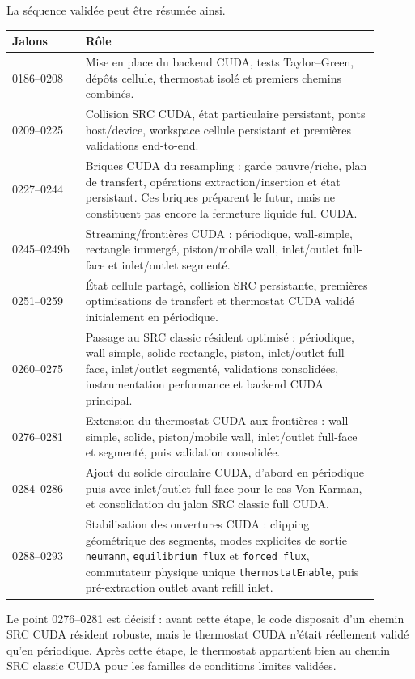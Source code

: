 \documentclass[11pt,a4paper]{article}
\begin{document}
La séquence validée peut être résumée ainsi.
\begin{center}
\begin{tabular}{p{0.18\linewidth}p{0.72\linewidth}}
\toprule
Jalons & Rôle \\
\midrule
0186--0208 & Mise en place du backend CUDA, tests Taylor--Green, dépôts cellule, thermostat isolé et premiers chemins combinés. \\
0209--0225 & Collision SRC CUDA, état particulaire persistant, ponts host/device, workspace cellule persistant et premières validations end-to-end. \\
0227--0244 & Briques CUDA du resampling : garde pauvre/riche, plan de transfert, opérations extraction/insertion et état persistant. Ces briques préparent le futur, mais ne constituent pas encore la fermeture liquide full CUDA. \\
0245--0249b & Streaming/frontières CUDA : périodique, wall-simple, rectangle immergé, piston/mobile wall, inlet/outlet full-face et inlet/outlet segmenté. \\
0251--0259 & État cellule partagé, collision SRC persistante, premières optimisations de transfert et thermostat CUDA validé initialement en périodique. \\
0260--0275 & Passage au SRC classic résident optimisé : périodique, wall-simple, solide rectangle, piston, inlet/outlet full-face, inlet/outlet segmenté, validations consolidées, instrumentation performance et backend CUDA principal. \\
0276--0281 & Extension du thermostat CUDA aux frontières : wall-simple, solide, piston/mobile wall, inlet/outlet full-face et segmenté, puis validation consolidée. \\
0284--0286 & Ajout du solide circulaire CUDA, d'abord en périodique puis avec inlet/outlet full-face pour le cas Von Karman, et consolidation du jalon SRC classic full CUDA. \\
0288--0293 & Stabilisation des ouvertures CUDA : clipping géométrique des segments, modes explicites de sortie \texttt{neumann}, \texttt{equilibrium\_flux} et \texttt{forced\_flux}, commutateur physique unique \texttt{thermostatEnable}, puis pré-extraction outlet avant refill inlet. \\
\bottomrule
\end{tabular}
\end{center}

Le point 0276--0281 est décisif : avant cette étape, le code disposait d'un chemin SRC CUDA résident robuste, mais le thermostat CUDA n'était réellement validé qu'en périodique. Après cette étape, le thermostat appartient bien au chemin SRC classic CUDA pour les familles de conditions limites validées.
\end{document}
